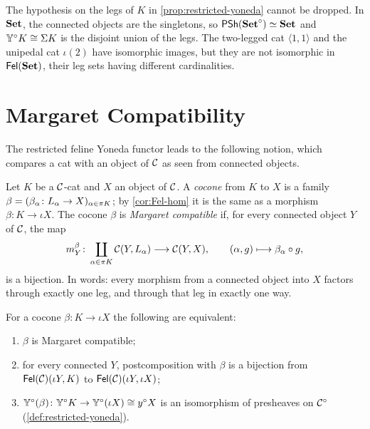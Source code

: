 \begin{counterexample}\label{cex:restricted-not-ff}
The hypothesis on the legs of $K$ in \cref{prop:restricted-yoneda} cannot be
dropped. In $\mathbf{Set}$, the connected objects are the singletons, so
$\mathsf{PSh}(\mathbf{Set}^\circ)\simeq\mathbf{Set}$ and $\mathbb{Y}^\circ K\cong\Sigma K$ is the disjoint union
of the legs. The two-legged cat $\langle1,1\rangle$ and the unipedal cat
$\iota(2)$ have isomorphic images, but they are not isomorphic in
$\mathsf{Fel}(\mathbf{Set})$, their leg sets having different cardinalities.
\end{counterexample}

\section{Margaret Compatibility}\label{sec:margaret}

The restricted feline Yoneda functor leads to the following notion, which
compares a cat with an object of $\mathcal{C}$ as seen from connected objects.

\begin{definition}\label{def:margaret}
Let $K$ be a $\mathcal{C}$-cat and $X$ an object of $\mathcal{C}$. A \emph{cocone} from $K$ to
$X$ is a family $\beta=(\beta_\alpha\colon L_\alpha\to X)_{\alpha\in\pi K}$;
by \cref{cor:Fel-hom} it is the same as a morphism $\beta\colon K\to\iota X$.
The cocone $\beta$ is \emph{Margaret compatible} if, for every connected object
$Y$ of $\mathcal{C}$, the map
\[
m^\beta_Y\colon\coprod_{\alpha\in\pi K}\mathcal{C}(Y,L_\alpha)\longrightarrow\mathcal{C}(Y,X),\qquad(\alpha,g)\longmapsto\beta_\alpha\circ g,
\]
is a bijection. In words: every morphism from a connected object into $X$
factors through exactly one leg, and through that leg in exactly one way.
\end{definition}

\begin{proposition}\label{prop:margaret-equiv}
For a cocone $\beta\colon K\to\iota X$ the following are equivalent:
\begin{enumerate}
\item $\beta$ is Margaret compatible;
\item for every connected $Y$, postcomposition with $\beta$ is a bijection
  from $\mathsf{Fel}(\mathcal{C})(\iota Y,K)$ to $\mathsf{Fel}(\mathcal{C})(\iota Y,\iota X)$;
\item $\mathbb{Y}^\circ(\beta)\colon\mathbb{Y}^\circ K\to\mathbb{Y}^\circ(\iota X)\cong y^\circ X$ is an
  isomorphism of presheaves on $\mathcal{C}^\circ$ (\cref{def:restricted-yoneda}).
\end{enumerate}
\end{proposition}

